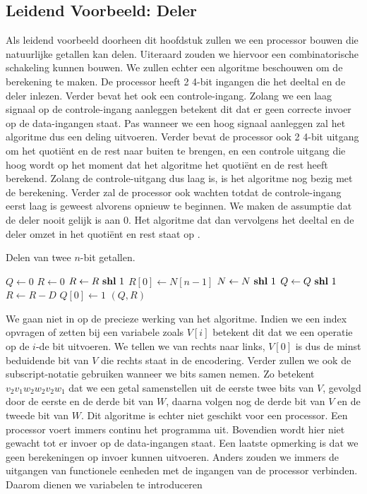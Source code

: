 \subsection{Leidend Voorbeeld: Deler}
Als leidend voorbeeld doorheen dit hoofdstuk zullen we een processor bouwen die natuurlijke getallen kan delen. Uiteraard zouden we hiervoor een combinatorische schakeling kunnen bouwen. We zullen echter een algoritme beschouwen om de berekening te maken. De processor heeft 2 4-bit ingangen die het deeltal en de deler inlezen. Verder bevat het ook een controle-ingang. Zolang we een laag signaal op de controle-ingang aanleggen betekent dit dat er geen correcte invoer op de data-ingangen staat. Pas wanneer we een hoog signaal aanleggen zal het algoritme dus een deling uitvoeren. Verder bevat de processor ook 2 4-bit uitgang om het quoti\"ent en de rest naar buiten te brengen, en een controle uitgang die hoog wordt op het moment dat het algoritme het quoti\"ent en de rest heeft berekend. Zolang de controle-uitgang dus laag is, is het algoritme nog bezig met de berekening. Verder zal de processor ook wachten totdat de controle-ingang eerst laag is geweest alvorens opnieuw te beginnen. We maken de assumptie dat
de deler nooit gelijk is aan 0. Het algoritme dat dan vervolgens het deeltal en de deler omzet in het quoti\"ent en rest staat op .
\begin{algorithm}[hbt]
\caption{Delen van twee $n$-bit getallen.}
\begin{algorithmic}[1]
\State $Q\gets 0$
\State $R\gets 0$
\State $R\gets R\mbox{ \textbf{shl} }{}1$
\State $R\left[0\right]\gets N\left[n-1\right]$
\State $N\gets N\mbox{ \textbf{shl} }{}1$
\State $Q\gets Q\mbox{ \textbf{shl} }{}1$
\State $R\gets R-D$
\State $Q\left[0\right]\gets 1$
\EndIf
\EndFor
\State \Return $\left(Q,R\right)$
\EndFunction
\end{algorithmic}
\end{algorithm}
We gaan niet in op de precieze werking van het algoritme. Indien we een index opvragen of zetten bij een variabele zoals $V\left[i\right]$ betekent dit dat we een operatie op de $i$-de bit uitvoeren. We tellen we van rechts naar links, $V[0]$ is dus de minst beduidende bit van $V$ die rechts staat in de encodering. Verder zullen we ook de subscript-notatie gebruiken wanneer we bits samen nemen. Zo betekent $v_2v_1w_2w_2v_2w_1$ dat we een getal samenstellen uit de eerste twee bits van $V$, gevolgd door de eerste en de derde bit van $W$, daarna volgen nog de derde bit van $V$ en de tweede bit van $W$. Dit algoritme is echter niet geschikt voor een processor. Een processor voert immers continu het programma uit. Bovendien wordt hier niet gewacht tot er invoer op de data-ingangen staat. Een laatste opmerking is dat we geen berekeningen op invoer kunnen uitvoeren. Anders zouden we immers de uitgangen van functionele eenheden met de ingangen van de processor verbinden. Daarom dienen we variabelen te introduceren
